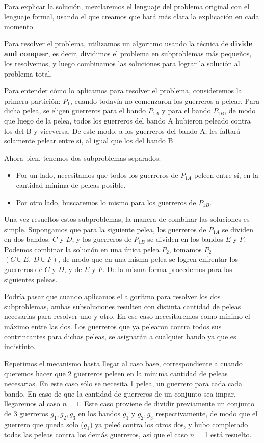 Para explicar la solución, mezclaremos el lenguaje del problema original con el lenguaje formal, usando el que creamos que hará más clara la explicación en cada momento.

Para resolver el problema, utilizamos un algoritmo usando la técnica de \textbf{divide and conquer}, es decir, dividimos el problema en subproblemas más pequeños, los resolvemos, y luego combinamos las soluciones para lograr la solución al problema total.

Para entender cómo lo aplicamos para resolver el problema, consideremos la primera partición: $P_1$, cuando todavía no comenzaron los guerreros a pelear.
Para dicha pelea, se eligen guerreros para el bando $P_{1A}$ y para el bando $P_{1B}$, de modo que luego de la pelea, todos los guerreros del bando A hubieron peleado contra los del B y viceversa.
De este modo, a los guerreros del bando A, les faltará solamente pelear entre sí, al igual que los del bando B.

Ahora bien, tenemos dos subproblemas separados: 
\begin{itemize}
\item Por un lado, necesitamos que todos los guerreros de $P_{1A}$ peleen entre sí, en la cantidad mínima de peleas posible.
\item Por otro lado, buscaremos lo mismo para los guerreros de $P_{1B}$.
\end{itemize}

Una vez resueltos estos subproblemas, la manera de combinar las soluciones es simple. Supongamos que para la siguiente pelea, los guerreros de $P_{1A}$ se dividen en dos bandos: $C$ y $D$, y los guerreros de $P_{1B}$ se dividen en los bandos $E$ y $F$. Podemos combinar la solución en una única pelea $P_2$, tomamos $P_2$ = $(C \cup E,\ D \cup F)$, de modo que en una misma pelea se logren enfrentar los guerreros de $C$ y $D$, y de $E$ y $F$. De la misma forma procedemos para las siguientes peleas.

Podría pasar que cuando aplicamos el algoritmo para resolver los dos subproblemas, ambas subsoluciones resulten con distinta cantidad de peleas necesarias para resolver uno y otro. En ese caso necesitaremos como mínimo el máximo entre las dos. Los guerreros que ya pelearon contra todos sus contrincantes para dichas peleas, se asignarán a cualquier bando ya que es indistinto.

Repetimos el mecanismo hasta llegar al caso base, correspondiente a cuando queremos hacer que 2 guerreros peleen en la mínima cantidad de peleas necesarias. En  este caso sólo se necesita 1 pelea, un guerrero para cada cada bando. En caso de que la cantidad de guerreros de un conjunto sea impar, llegaremos al caso $n=1$. Este caso proviene de dividir previamente un conjunto de 3 guerreros $g_1, g_2, g_3$ en los bandos $g_1$ y  $g_2, g_3$ respectivamente, de modo que el guerrero que queda solo ($g_1$) ya peleó contra los otros dos, y hubo completado todas las peleas contra los demás guerreros, así que el caso $n$ = 1 está resuelto.

